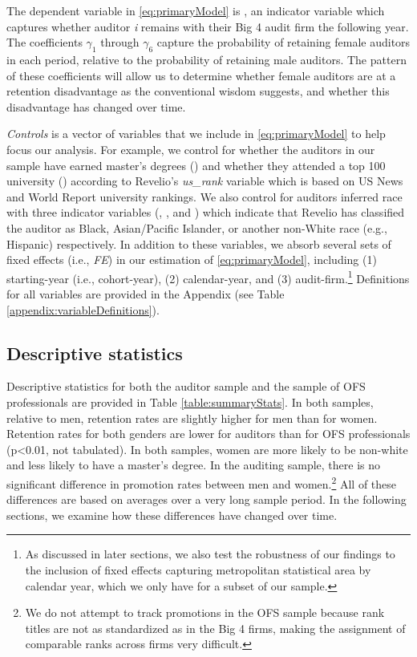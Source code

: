 \documentclass[11pt]{article}
\begin{document}
        The dependent variable in \ref{eq:primaryModel} is \RETAINED, an indicator variable which captures whether auditor \textit{i} remains with their Big 4 audit firm the following year. The coefficients $\gamma_1$ through $\gamma_6$ capture the probability of retaining female auditors in each period, relative to the probability of retaining male auditors. The pattern of these coefficients will allow us to determine whether female auditors are at a retention disadvantage as the conventional wisdom suggests, and whether this disadvantage has changed over time.

        \textit{Controls} is a vector of variables that we include in \ref{eq:primaryModel} to help focus our analysis. For example, we control for whether the auditors in our sample have earned master's degrees (\MASTERS) and whether they attended a top 100 university (\TOPUNIV) according to Revelio's \textit{us\_rank} variable which is based on US News and World Report university rankings. We also control for auditors inferred race with three indicator variables (\BLACKRACE, \APIRACE, and \OTHERRACE) which indicate that Revelio has classified the auditor as Black, Asian/Pacific Islander, or another non-White race (e.g., Hispanic) respectively. In addition to these variables, we absorb several sets of fixed effects (i.e., \textit{FE}) in our estimation of \ref{eq:primaryModel}, including (1) starting-year (i.e., cohort-year), (2) calendar-year, and (3) audit-firm.\footnote{As discussed in later sections, we also test the robustness of our findings to the inclusion of fixed effects capturing metropolitan statistical area by calendar year, which we only have for a subset of our sample.} Definitions for all variables are provided in the Appendix (see Table \ref{appendix:variableDefinitions}).

    \subsection{Descriptive statistics}\label{section:descriptiveStatistics}
        Descriptive statistics for both the auditor sample and the sample of OFS professionals are provided in Table \ref{table:summaryStats}. In both samples, relative to men, retention rates are slightly higher for men than for women. Retention rates for both genders are lower for auditors than for OFS professionals (p<0.01, not tabulated). In both samples, women are more likely to be non-white and less likely to have a master's degree. In the auditing sample, there is no significant difference in promotion rates between men and women.\footnote{We do not attempt to track promotions in the OFS sample because rank titles are not as standardized as in the Big 4 firms, making the assignment of comparable ranks across firms very difficult.} All of these differences are based on averages over a very long sample period. In the following sections, we examine how these differences have changed over time.
\end{document}
